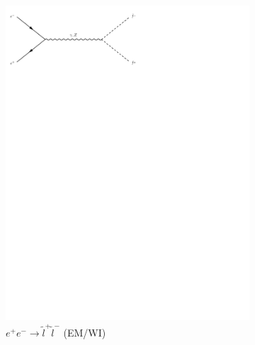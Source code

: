 \begin{figure}[h]
\begin{subfigure}[b]{0.3\textwidth}
    \includegraphics[trim={0.5cm 22cm 10cm 0cm},width=\textwidth]{../Diagrams/D3.pdf}
    \caption{$e^+e^-\rightarrow \tilde{l}^+\tilde{l}^-$ (EM/WI)}
    \label{fey:3}
  \end{subfigure}
  \newline
  \newline
  \begin{subfigure}[b]{0.3\textwidth}

\end{subfigure}
\end{figure}
